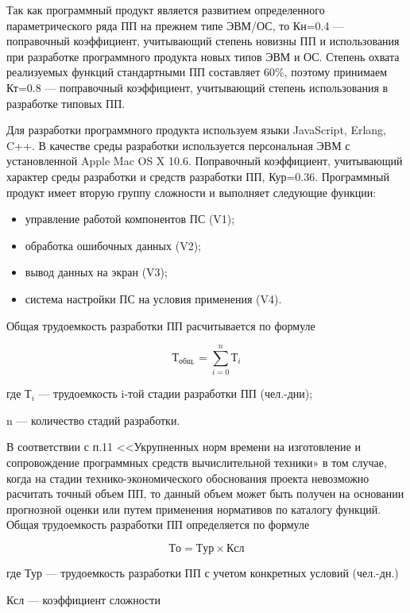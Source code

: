 Так как программный продукт является развитием определенного параметрического ряда ПП на прежнем типе ЭВМ/ОС,
то Кн=0.4 --- поправочный коэффициент, учитывающий степень новизны ПП и использования при разработке
программного продукта новых типов ЭВМ и ОС. Степень  охвата реализуемых функций стандартными ПП составляет 60\%, 
поэтому принимаем Кт=0.8 --- поправочный коэффициент, учитывающий степень 
использования в разработке типовых ПП.

Для разработки программного продукта используем языки JavaScript, Erlang, C++.
В качестве среды разработки используется персональная ЭВМ с установленной Apple Mac OS X 10.6.
Поправочный коэффициент, учитывающий характер среды разработки и средств разработки ПП, Кур=0.36.
Программный продукт имеет вторую группу сложности и выполняет следующие функции:

\begin{itemize}
    \item{} управление работой компонентов ПС (V1);
    \item{} обработка ошибочных данных (V2);
    \item{} вывод данных на экран (V3);
    \item{} система настройки ПС на условия применения (V4).
\end{itemize}

Общая трудоемкость разработки ПП расчитывается по формуле

\begin{equation}
    Т_{общ.} = \sum_{i=0}^{n}Т_i
\end{equation}
\begin{ESKDexplanation}
    \item[где ]{} $Т_i$ --- трудоемкость i-той стадии разработки ПП (чел.-дни);
    \item{} n --- количество стадий разработки.
\end{ESKDexplanation}

В соответствии с п.11 <<Укрупненных норм времени на изготовление и сопровождение программных
средств вычислительной техники» в том случае, когда на стадии технико-экономического
обоснования проекта невозможно расчитать точный объем ПП, то данный объем может быть 
получен на основании прогнозной оценки или путем применения нормативов по каталогу функций.
Общая трудоемкость разработки ПП определяется по формуле

\begin{equation}
    То = Тур \times{} Ксл
\end{equation}
\begin{ESKDexplanation}
    \item[где ]{} Тур --- трудоемкость разработки ПП с учетом конкретных условий (чел.-дн.)
    \item{} Ксл --- коэффициент сложности 
\end{ESKDexplanation}


